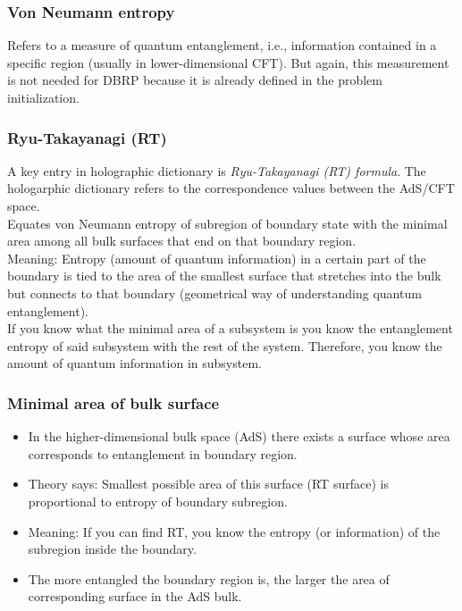\documentclass[12pt]{article}
\begin{document}
    \subsubsection{Von Neumann entropy}
        \hspace{0.5cm} Refers to a measure of quantum entanglement, i.e., information contained in a specific region (usually in lower-dimensional CFT). But again, this measurement is not needed for DBRP because it is already defined in the problem initialization.

    \subsubsection{Ryu-Takayanagi (RT)}
        \hspace{0.5cm} A key entry in holographic dictionary is \textit{Ryu-Takayanagi (RT) formula}. The hologarphic dictionary refers to the correspondence values between the AdS/CFT space.
        \\
        Equates von Neumann entropy of subregion of boundary state with the minimal area among all bulk surfaces that end on that boundary region.
        \\
        Meaning: Entropy (amount of quantum information) in a certain part of the boundary is tied to the area of the smallest surface that stretches into the bulk but connects to that boundary (geometrical way of understanding quantum entanglement).
        \\
        If you know what the minimal area of a subsystem is you know the entanglement entropy of said subsystem with the rest of the system. Therefore, you know the amount of quantum information in subsystem.

    \subsubsection*{Minimal area of bulk surface}
    \begin{itemize}
        \item In the higher-dimensional bulk space (AdS) there exists a surface whose area corresponds to entanglement in boundary region.
        \item Theory says: Smallest possible area of this surface (RT surface) is proportional to entropy of boundary subregion.
        \item Meaning: If you can find RT, you know the entropy (or information) of the subregion inside the boundary.
        \item The more entangled the boundary region is, the larger the area of corresponding surface in the AdS bulk.
    \end{itemize}
\end{document}
